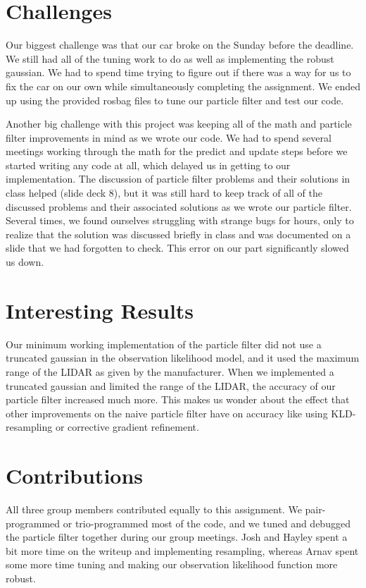 \section{Challenges}

Our biggest challenge was that our car broke on the Sunday before the deadline. We still had all of the tuning work to do as well as implementing the robust gaussian. We had to spend time trying to figure out if there was a way for us to fix the car on our own while simultaneously completing the assignment. We ended up using the provided rosbag files to tune our particle filter and test our code.

Another big challenge with this project was keeping all of the math and particle filter improvements in mind as we wrote our code. We had to spend several meetings working through the math for the predict and update steps before we started writing any code at all, which delayed us in getting to our implementation. The discussion of particle filter problems and their solutions in class helped (slide deck 8), but it was still hard to keep track of all of the discussed problems and their associated solutions as we wrote our particle filter. Several times, we found ourselves struggling with strange bugs for hours, only to realize that the solution was discussed briefly in class and was documented on a slide that we had forgotten to check. This error on our part significantly slowed us down. 

\section{Interesting Results}
Our minimum working implementation of the particle filter did not use a truncated gaussian in the observation likelihood model, and it used the maximum range of the LIDAR as given by the manufacturer. When we implemented a truncated gaussian and limited the range of the LIDAR, the accuracy of our particle filter increased much more. This makes us wonder about the effect that other improvements on the naive particle filter have on accuracy like using KLD-resampling or corrective gradient refinement. 

\section{Contributions}

All three group members contributed equally to this assignment. We pair-programmed or trio-programmed most of the code, and we tuned and debugged the particle filter together during our group meetings. Josh and Hayley spent a bit more time on the writeup and implementing resampling, whereas Arnav spent some more time tuning and making our observation likelihood function more robust.

